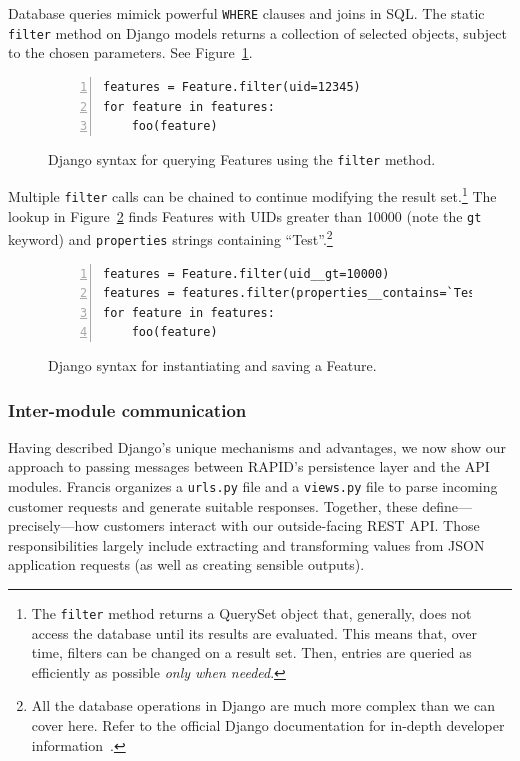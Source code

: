 Database queries mimick powerful \texttt{WHERE} clauses and joins in SQL. The static \texttt{filter} method on Django models returns a collection of selected objects, subject to the chosen parameters. See Figure~\ref{fig:filter1}.

\begin{figure}[ht]
\vspace{12pt}
\begin{Verbatim}[samepage=true,baselinestretch=1,numbers=left,xleftmargin=12mm]
features = Feature.filter(uid=12345)
for feature in features:
    foo(feature)
\end{Verbatim}
\vspace{-10pt}
\caption{Django syntax for querying Features using the \texttt{filter} method.}
\label{fig:filter1}
\end{figure}

Multiple \texttt{filter} calls can be chained to continue modifying the result set.\footnote{The \texttt{filter} method returns a QuerySet object that, generally, does not access the database until its results are evaluated. This means that, over time, filters can be changed on a result set. Then, entries are queried as efficiently as possible \textit{only when needed}.} The lookup in Figure~\ref{fig:filter2} finds Features with UIDs greater than 10000 (note the \texttt{gt} keyword) and \texttt{properties} strings containing ``Test''.\footnote{All the database operations in Django are much more complex than we can cover here. Refer to the official Django documentation for in-depth developer information~\cite{GeoDb}.}

\begin{figure}[ht]
\begin{Verbatim}[samepage=true,baselinestretch=1,numbers=left,xleftmargin=12mm]
features = Feature.filter(uid__gt=10000)
features = features.filter(properties__contains=`Test')
for feature in features:
    foo(feature)
\end{Verbatim}
\vspace{-20pt}
\caption{Django syntax for instantiating and saving a Feature.}
\label{fig:filter2}
\end{figure}

\subsubsection{Inter-module communication}
Having described Django's unique mechanisms and advantages, we now show our approach to passing messages between RAPID's persistence layer and the API modules. Francis organizes a \texttt{urls.py} file and a \texttt{views.py} file to parse incoming customer requests and generate suitable responses. Together, these define---precisely---how customers interact with our outside-facing REST API. Those responsibilities largely include extracting and transforming values from JSON application requests (as well as creating sensible outputs).


